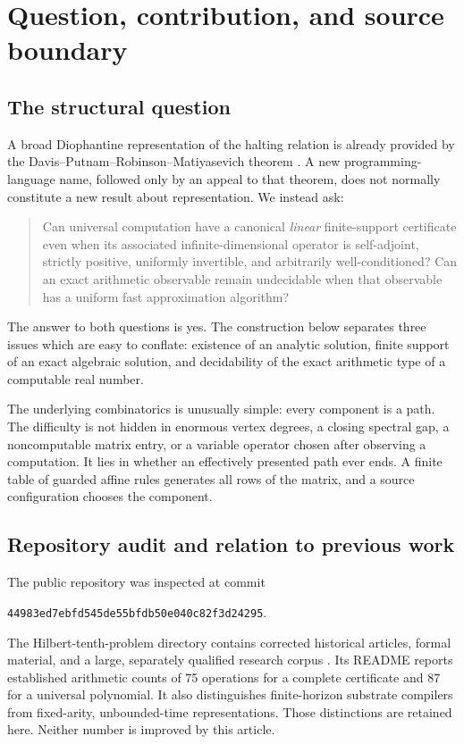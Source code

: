 \documentclass[11pt,letterpaper]{article}
\theoremstyle{definition}
\theoremstyle{remark}
\begin{document}
\section{Question, contribution, and source boundary}\label{ste:cg:sec:scope}
\subsection{The structural question}
A broad Diophantine representation of the halting relation is already
provided by the Davis--Putnam--Robinson--Matiyasevich theorem
\cite{matiyasevich1970}. A new
programming-language name, followed only by an appeal to that theorem, does
not normally constitute a new result about representation. We instead ask:
\begin{quote}
Can universal computation have a canonical \emph{linear} finite-support
certificate even when its associated infinite-dimensional operator is
self-adjoint, strictly positive, uniformly invertible, and arbitrarily
well-conditioned? Can an exact arithmetic observable remain undecidable
when that observable has a uniform fast approximation algorithm?
\end{quote}
The answer to both questions is yes. The construction below separates three
issues which are easy to conflate: existence of an analytic solution,
finite support of an exact algebraic solution, and decidability of the exact
arithmetic type of a computable real number.

The underlying combinatorics is unusually simple: every component is a
path. The difficulty is not hidden in enormous vertex degrees, a closing
spectral gap, a noncomputable matrix entry, or a variable operator chosen
after observing a computation. It lies in whether an effectively presented
path ever ends. A finite table of guarded affine rules generates all rows
of the matrix, and a source configuration chooses the component.

\subsection{Repository audit and relation to previous work}
The public repository was inspected at commit
\begin{center}
\texttt{44983ed7ebfd545de55bfdb50e040c82f3d24295}.
\end{center}
The Hilbert-tenth-problem directory contains corrected historical articles,
formal material, and a large, separately qualified research corpus
\cite{repoH10}. Its README reports established arithmetic counts of 75
operations for a complete certificate and 87 for a universal polynomial.
It also distinguishes finite-horizon substrate compilers from fixed-arity,
unbounded-time representations. Those distinctions are retained here.
Neither number is improved by this article.
\end{document}

